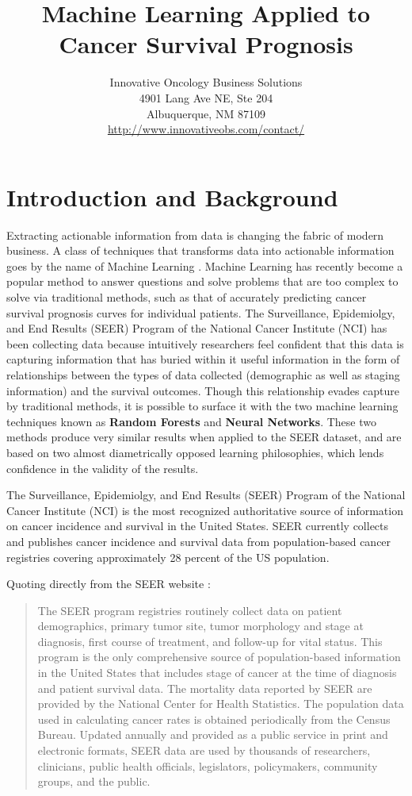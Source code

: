 \documentclass[a4paper,11pt]{article}
\title{Machine Learning Applied to Cancer Survival Prognosis}
\author{Innovative Oncology Business Solutions \\
 4901 Lang Ave NE, Ste 204 \\
Albuquerque, NM 87109 \\
\url{http://www.innovativeobs.com/contact/}}
\date{}
\begin{document}
\maketitle
\flushbottom


\section{Introduction and Background}
\label{sec:intro}



Extracting actionable information from data is changing the fabric of modern business. A class of techniques that transforms data into actionable information goes by the name of Machine Learning \cite{pythonmachinelearning}.
Machine Learning has recently become a popular method to answer questions and solve problems that are too complex to solve via traditional methods, such as that of accurately predicting cancer survival prognosis curves for individual patients.
The Surveillance, Epidemiolgy, and End Results (SEER) Program of the National Cancer Institute (NCI) has been collecting data because intuitively researchers feel confident that this data is capturing information that has buried within it useful information in the form of  relationships between the types of data collected (demographic as well as staging information) and the survival outcomes.
Though this relationship evades capture by traditional methods, it is possible to surface it with the two machine learning techniques known as \textbf{Random Forests} and \textbf{Neural Networks}. These two methods produce very similar results when applied to the SEER dataset, and are based on two almost diametrically opposed learning philosophies, which lends confidence in the validity of the results.

The Surveillance, Epidemiolgy, and End Results (SEER) Program of the National Cancer Institute (NCI) is the most recognized authoritative source of information on cancer incidence and survival in the United States. SEER currently collects and publishes cancer incidence and survival data from population-based cancer registries covering approximately 28 percent of the US population.


Quoting directly from the SEER
website \citep{seerwebsite}:

\begin{quote}
The SEER program registries routinely collect data on patient demographics, primary tumor site, tumor morphology and stage at diagnosis, first course of treatment, and follow-up for vital status. This program is the only comprehensive source of population-based information in the United States that includes stage of cancer at the time of diagnosis and patient survival data. The mortality data reported by SEER are provided by the National Center for Health Statistics. The population data used in calculating cancer rates is obtained periodically from the Census Bureau. Updated annually and provided as a public service in print and electronic formats, SEER data are used by thousands of researchers, clinicians, public health officials, legislators, policymakers, community groups, and the public.
\end{quote}
\end{document}

